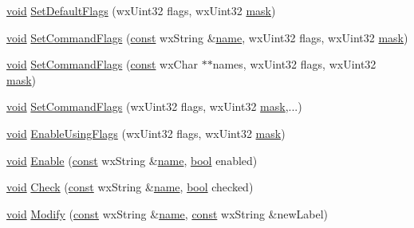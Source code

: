 \begin{DoxyCompactItemize}
\item 
\hyperlink{sound_8c_ae35f5844602719cf66324f4de2a658b3}{void} \hyperlink{class_command_manager_a6a52a2bb106ffa5749f657b970b68f45}{Set\+Default\+Flags} (wx\+Uint32 flags, wx\+Uint32 \hyperlink{structmask}{mask})
\item 
\hyperlink{sound_8c_ae35f5844602719cf66324f4de2a658b3}{void} \hyperlink{class_command_manager_a21197bcf76ab2fe8d7d4d7f7ff01f266}{Set\+Command\+Flags} (\hyperlink{getopt1_8c_a2c212835823e3c54a8ab6d95c652660e}{const} wx\+String \&\hyperlink{lib_2expat_8h_a1b49b495b59f9e73205b69ad1a2965b0}{name}, wx\+Uint32 flags, wx\+Uint32 \hyperlink{structmask}{mask})
\item 
\hyperlink{sound_8c_ae35f5844602719cf66324f4de2a658b3}{void} \hyperlink{class_command_manager_ae2e266fa8405e76fb646f9ff397ff5cb}{Set\+Command\+Flags} (\hyperlink{getopt1_8c_a2c212835823e3c54a8ab6d95c652660e}{const} wx\+Char $\ast$$\ast$names, wx\+Uint32 flags, wx\+Uint32 \hyperlink{structmask}{mask})
\item 
\hyperlink{sound_8c_ae35f5844602719cf66324f4de2a658b3}{void} \hyperlink{class_command_manager_ae041804841ad0f02146753a10d07a04d}{Set\+Command\+Flags} (wx\+Uint32 flags, wx\+Uint32 \hyperlink{structmask}{mask},...)
\item 
\hyperlink{sound_8c_ae35f5844602719cf66324f4de2a658b3}{void} \hyperlink{class_command_manager_ab8bc5911e0f7c4d3d9f593183ad0a295}{Enable\+Using\+Flags} (wx\+Uint32 flags, wx\+Uint32 \hyperlink{structmask}{mask})
\item 
\hyperlink{sound_8c_ae35f5844602719cf66324f4de2a658b3}{void} \hyperlink{class_command_manager_a1582e3cb6f2fa3fe214f8eaa4c3a158f}{Enable} (\hyperlink{getopt1_8c_a2c212835823e3c54a8ab6d95c652660e}{const} wx\+String \&\hyperlink{lib_2expat_8h_a1b49b495b59f9e73205b69ad1a2965b0}{name}, \hyperlink{mac_2config_2i386_2lib-src_2libsoxr_2soxr-config_8h_abb452686968e48b67397da5f97445f5b}{bool} enabled)
\item 
\hyperlink{sound_8c_ae35f5844602719cf66324f4de2a658b3}{void} \hyperlink{class_command_manager_a93f09715142a3a131e51bbb4a9b42266}{Check} (\hyperlink{getopt1_8c_a2c212835823e3c54a8ab6d95c652660e}{const} wx\+String \&\hyperlink{lib_2expat_8h_a1b49b495b59f9e73205b69ad1a2965b0}{name}, \hyperlink{mac_2config_2i386_2lib-src_2libsoxr_2soxr-config_8h_abb452686968e48b67397da5f97445f5b}{bool} checked)
\item 
\hyperlink{sound_8c_ae35f5844602719cf66324f4de2a658b3}{void} \hyperlink{class_command_manager_ad2da48afc66e271f139c4b54f810ae86}{Modify} (\hyperlink{getopt1_8c_a2c212835823e3c54a8ab6d95c652660e}{const} wx\+String \&\hyperlink{lib_2expat_8h_a1b49b495b59f9e73205b69ad1a2965b0}{name}, \hyperlink{getopt1_8c_a2c212835823e3c54a8ab6d95c652660e}{const} wx\+String \&new\+Label)
$$
\end{DoxyCompactItemize}
